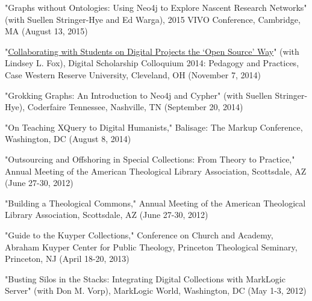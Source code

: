 \documentclass[10pt]{res} %
\begin{document}
\begin{resume}
\begin{hangparas}{.25in}{1}"Graphs without Ontologies: Using Neo4j to Explore Nascent Research Networks" (with Suellen Stringer-Hye and Ed Warga), 2015 VIVO Conference, Cambridge, MA (August 13, 2015)\end{hangparas}

\begin{hangparas}{.25in}{1}"\href{https://www.youtube.com/watch?v=-Hbg6r3JZAQ}{Collaborating with Students on Digital Projects the ‘Open Source’ Way}" (with Lindsey L. Fox), Digital Scholarship Colloquium 2014: Pedagogy and Practices, Case Western Reserve University, Cleveland, OH (November 7, 2014)\end{hangparas}

\begin{hangparas}{.25in}{1}"Grokking Graphs: An Introduction to Neo4j and Cypher" (with Suellen Stringer-Hye), Coderfaire Tennessee, Nashville, TN (September 20, 2014)\end{hangparas}

\begin{hangparas}{.25in}{1}"On Teaching XQuery to Digital Humanists," Balisage: The Markup Conference, Washington, DC (August 8, 2014)\end{hangparas}

\begin{hangparas}{.25in}{1}"Outsourcing and Offshoring in Special Collections: From Theory to Practice," Annual Meeting of the American Theological Library Association, Scottsdale, AZ (June 27-30, 2012)\end{hangparas}

\begin{hangparas}{.25in}{1}"Building a Theological Commons," Annual Meeting of the American Theological Library Association, Scottsdale, AZ (June 27-30, 2012)\end{hangparas}

\begin{hangparas}{.25in}{1}"Guide to the Kuyper Collections," Conference on Church and Academy, Abraham Kuyper Center for Public Theology, Princeton Theological Seminary, Princeton, NJ (April 18-20, 2013)\end{hangparas}

\begin{hangparas}{.25in}{1}"Busting Silos in the Stacks: Integrating Digital Collections with MarkLogic Server" (with Don M. Vorp), MarkLogic World, Washington, DC (May 1-3, 2012)\end{hangparas}


\end{resume}
\end{document}
